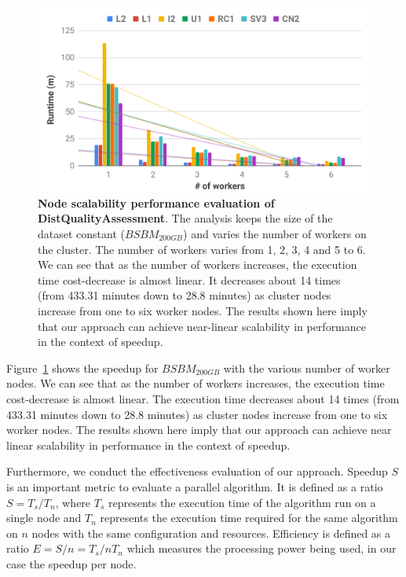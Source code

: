 \begin{figure}
\centering
  \includegraphics[width=1.0\columnwidth]{images/5_distqualityassessment/distqualityassessment-node-scalability.pdf}
    \caption{\textbf{Node scalability performance evaluation of DistQualityAssessment}.
    The analysis keeps the size of the dataset constant ($BSBM_{200GB}$) and varies the number of workers on the cluster.
    The number of workers varies from 1, 2, 3, 4 and 5 to 6.
    We can see that as the number of workers increases, the execution time cost-decrease is almost linear. 
    It decreases about 14 times (from 433.31 minutes down to 28.8 minutes) as cluster nodes increase from one to six worker nodes. The results shown here imply that our approach can achieve near-linear scalability in performance in the context of speedup.}
    \label{fig:distqualityassessment-node-scalability}
\end{figure}

Figure~\ref{fig:distqualityassessment-node-scalability} shows the speedup for $BSBM_{200GB}$ with the various number of worker nodes.
We can see that as the number of workers increases, the execution time cost-decrease is almost linear.
The execution time decreases about 14 times (from 433.31 minutes down to 28.8 minutes) as cluster nodes increase from one to six worker nodes.
The results shown here imply that our approach can achieve near linear scalability in performance in the context of speedup.

Furthermore, we conduct the effectiveness evaluation of our approach.
Speedup $S$ is an important metric to evaluate a parallel algorithm.
It is defined as a ratio $S=T_s/T_n$, where $T_s$ represents the execution time of the algorithm run on a single node and $T_n$ represents the execution time required for the same algorithm on $n$ nodes with the same configuration and resources.
Efficiency is defined as a ratio $E = S/n =T_s/n T_n$ which measures the processing power being used, in our case the speedup per node.

